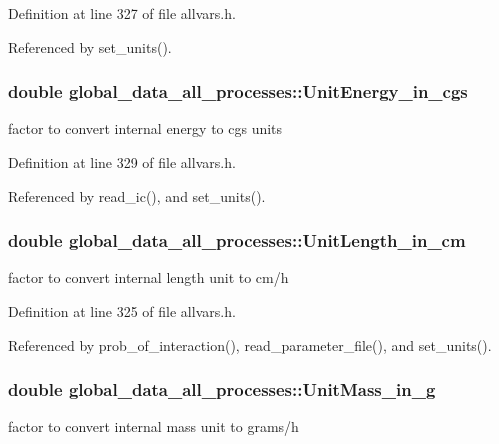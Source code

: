 Definition at line 327 of file allvars.h.



Referenced by set\_\-units().

\hypertarget{structglobal__data__all__processes_ab0d48e2253ad31d76eda8e677eba2cf1}{
\subsubsection[{UnitEnergy\_\-in\_\-cgs}]{\setlength{\rightskip}{0pt plus 5cm}double {\bf global\_\-data\_\-all\_\-processes::UnitEnergy\_\-in\_\-cgs}}}
\label{structglobal__data__all__processes_ab0d48e2253ad31d76eda8e677eba2cf1}
factor to convert internal energy to cgs units 

Definition at line 329 of file allvars.h.



Referenced by read\_\-ic(), and set\_\-units().

\hypertarget{structglobal__data__all__processes_a111a45896aafd67faa8f0c9ef897612f}{
\subsubsection[{UnitLength\_\-in\_\-cm}]{\setlength{\rightskip}{0pt plus 5cm}double {\bf global\_\-data\_\-all\_\-processes::UnitLength\_\-in\_\-cm}}}
\label{structglobal__data__all__processes_a111a45896aafd67faa8f0c9ef897612f}
factor to convert internal length unit to cm/h 

Definition at line 325 of file allvars.h.



Referenced by prob\_\-of\_\-interaction(), read\_\-parameter\_\-file(), and set\_\-units().

\hypertarget{structglobal__data__all__processes_adccf5aa82d4252d8d24ead7681b29052}{
\subsubsection[{UnitMass\_\-in\_\-g}]{\setlength{\rightskip}{0pt plus 5cm}double {\bf global\_\-data\_\-all\_\-processes::UnitMass\_\-in\_\-g}}}
\label{structglobal__data__all__processes_adccf5aa82d4252d8d24ead7681b29052}
factor to convert internal mass unit to grams/h 

